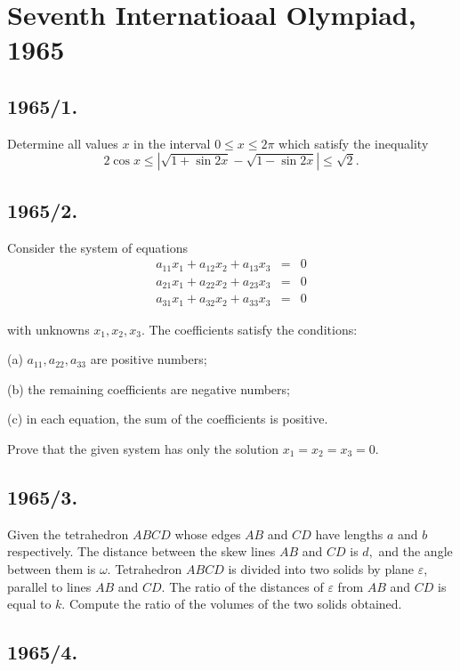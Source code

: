 \documentclass[12pt,thmsa]{article}
\begin{document}
\section{Seventh Internatioaal Olympiad, 1965}

\subsection{1965/1.}

Determine all values $x$ in the interval $0\leq x\leq 2\pi $ which satisfy
the inequality
\[
2\cos x\leq \left| \sqrt{1+\sin 2x}-\sqrt{1-\sin 2x}\right| \leq \sqrt{2}.
\]

\subsection{1965/2.}

Consider the system of equations
\begin{eqnarray*}
a_{11}x_{1}+a_{12}x_{2}+a_{13}x_{3} &=&0 \\
a_{21}x_{1}+a_{22}x_{2}+a_{23}x_{3} &=&0 \\
a_{31}x_{1}+a_{32}x_{2}+a_{33}x_{3} &=&0
\end{eqnarray*}

with unknowns $x_{1},x_{2},x_{3}$. The coefficients satisfy the conditions:

(a) $a_{11},a_{22},a_{33}$ are positive numbers;

(b) the remaining coefficients are negative numbers;

(c) in each equation, the sum of the coefficients is positive.

Prove that the given system has only the solution $x_{1}=x_{2}=x_{3}=0$.

\subsection{1965/3.}

Given the tetrahedron $ABCD$ whose edges $AB$ and $CD$ have lengths $a$ and $%
b$ respectively. The distance between the skew lines $AB$ and $CD$ is $d,$
and the angle between them is $\omega $. Tetrahedron $ABCD$ is divided into
two solids by plane $\varepsilon $, parallel to lines $AB$ and $CD.$ The
ratio of the distances of $\varepsilon $ from $AB$ and $CD$ is equal to $k.$
Compute the ratio of the volumes of the two solids obtained.

\subsection{1965/4.}
\end{document}
